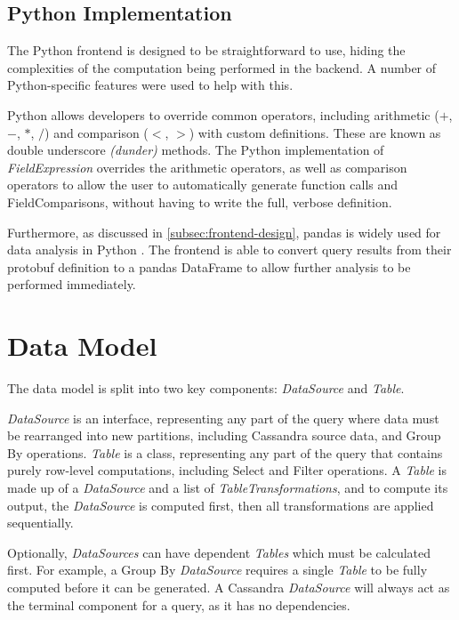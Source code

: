 \subsection{Python Implementation}
The Python frontend is designed to be straightforward to use, hiding the complexities of the computation being performed in the backend. A number of Python-specific features were used to help with this.

Python allows developers to override common operators, including arithmetic ($+$, $-$, $*$, $/$) and comparison ($<$, $>$) with custom definitions. These are known as double underscore \textit{(dunder)} methods. The Python implementation of \textit{FieldExpression} overrides the arithmetic operators, as well as comparison operators to allow the user to automatically generate function calls and FieldComparisons, without having to write the full, verbose definition.

Furthermore, as discussed in \ref{subsec:frontend-design}, pandas is widely used for data analysis in Python \cite{reback2020pandas}. The frontend is able to convert query results from their protobuf definition to a pandas DataFrame to allow further analysis to be performed immediately.



\section{Data Model}\label{subsec:data-model}
The data model is split into two key components: \textit{DataSource} and \textit{Table}. 

\textit{DataSource} is an interface, representing any part of the query where data must be rearranged into new partitions, including Cassandra source data, and Group By operations. \textit{Table} is a class, representing any part of the query that contains purely row-level computations, including Select and Filter operations. A \textit{Table} is made up of a \textit{DataSource} and a list of \textit{TableTransformations}, and to compute its output, the \textit{DataSource} is computed first, then all transformations are applied sequentially.

Optionally, \textit{DataSources} can have dependent \textit{Tables} which must be calculated first. For example, a Group By \textit{DataSource} requires a single \textit{Table} to be fully computed before it can be generated. A Cassandra \textit{DataSource} will always act as the terminal component for a query, as it has no dependencies.

